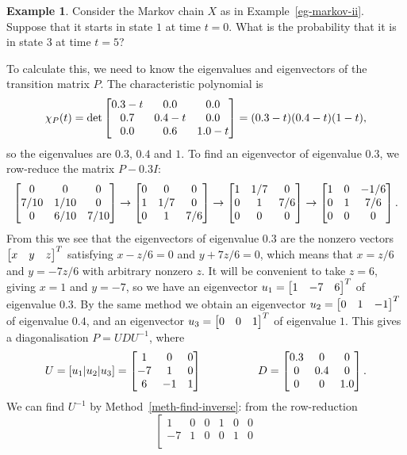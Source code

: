 \documentclass[reqno]{amsart}
\theoremstyle{definition}
\newtheorem{example}[theorem]{Example}
\begin{document}
\begin{example}\label{eg-markov-ii-again}
 Consider the Markov chain $X$ as in Example~\ref{eg-markov-ii}.
 Suppose that it starts in state $1$ at time $t=0$.  What is the
 probability that it is in state $3$ at time $t=5$?

 To calculate this, we need to know the eigenvalues and eigenvectors
 of the transition matrix $P$.  The characteristic polynomial is
 \[ \chi_P(t) = \det\left[\begin{matrix}
     0.3-t & 0.0 & 0.0 \\
     0.7 & 0.4-t & 0.0 \\
     0.0 & 0.6 & 1.0-t
    \end{matrix}\right] = (0.3-t)(0.4-t)(1-t),
 \]
 so the eigenvalues are $0.3$, $0.4$ and $1$.  To find an eigenvector
 of eigenvalue $0.3$, we row-reduce the matrix $P-0.3I$:
 \[
    \left[\begin{matrix}
     0 & 0 & 0 \\
     7/10 & 1/10 & 0 \\
     0 & 6/10 & 7/10
    \end{matrix}\right]
    \to
    \left[\begin{matrix}
     0 & 0 & 0 \\
     1 & 1/7 & 0 \\
     0 & 1 & 7/6
    \end{matrix}\right]
    \to
    \left[\begin{matrix}
     1 & 1/7 & 0 \\
     0 & 1 & 7/6 \\
     0 & 0 & 0
    \end{matrix}\right]
    \to
    \left[\begin{matrix}
     1 & 0 & -1/6 \\
     0 & 1 & 7/6 \\
     0 & 0 & 0
    \end{matrix}\right].
 \]
 From this we see that the eigenvectors of eigenvalue $0.3$ are the
 nonzero vectors $\left[\begin{matrix} x & y & z\end{matrix}\right]^T$ satisfying $x-z/6=0$ and $y+7z/6=0$,
 which means that $x=z/6$ and $y=-7z/6$ with arbitrary nonzero $z$.  It will
 be convenient to take $z=6$, giving $x=1$ and $y=-7$, so we have an
 eigenvector $u_1=\left[\begin{matrix} 1 & -7 & 6\end{matrix}\right]^T$ of eigenvalue $0.3$.  By the
 same method we obtain an eigenvector $u_2=\left[\begin{matrix} 0 & 1 & -1 \end{matrix}\right]^T$ of
 eigenvalue $0.4$, and an eigenvector $u_3=\left[\begin{matrix} 0&0&1\end{matrix}\right]^T$ of
 eigenvalue $1$.  This gives a diagonalisation $P=UDU^{-1}$, where 
 \[ U = [u_1|u_2|u_3]
      = \left[\begin{matrix} 1 & 0 & 0 \\ -7 & 1 & 0 \\ 6 & -1 & 1 \end{matrix}\right]
    \hspace{5em} 
    D = \left[\begin{matrix} 0.3 & 0 & 0 \\ 0 & 0.4 & 0 \\ 0 & 0 & 1.0 \end{matrix}\right].
 \]
 We can find $U^{-1}$ by Method~\ref{meth-find-inverse}: from the
 row-reduction 
 \[ 
  \left[\begin{array}{ccc|ccc}
    1 &  0 &  0 &  1 &  0 &  0 \\
   -7 &  1 &  0 &  0 &  1 &  0 \\

\end{array}\]
\end{example}
\end{document}
